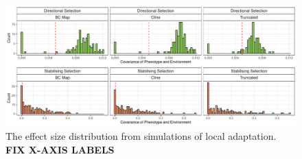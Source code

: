 \documentclass[11pt,twoside,lineno]{GSA_format}
\begin{document}
\begin{figure}[H]
  \includegraphics[width=\textwidth,height=0.75\textheight,keepaspectratio]{Plots/effectSizeDistributionPlot.pdf}
  \caption{The effect size distribution from simulations of local adaptation. \textbf{FIX X-AXIS LABELS}}

  \label{fig:effectSizeDistribution}
\end{figure}
\pagebreak
\end{document}
